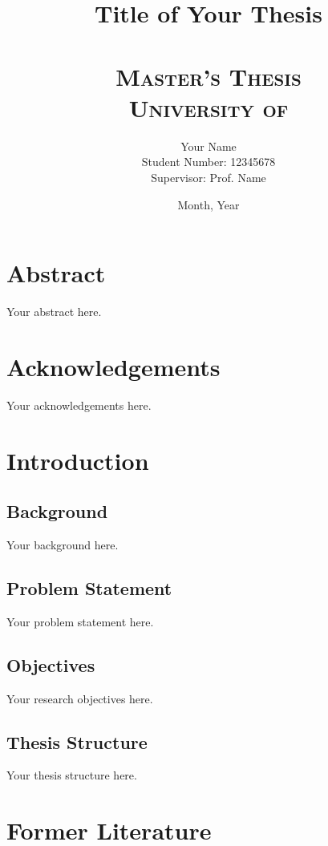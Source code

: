 \documentclass[12pt,a4paper]{report}
\title{
    \HRule \\[0.4cm]
    {\huge \bfseries Title of Your Thesis \\[0.4cm]}
    \HRule \\[1.5cm]
    \textsc{\Large Master's Thesis}\\[0.5cm]
    \textsc{\large University of }\\[0.5cm]
}
\author{
    \Large Your Name\\
    \Large Student Number: 12345678\\
    \Large Supervisor: Prof. Name
}
\date{Month, Year}
\begin{document}
\maketitle
\thispagestyle{empty}
\newpage

\chapter*{Abstract}
Your abstract here.

\newpage

\chapter*{Acknowledgements}
Your acknowledgements here.

\newpage

\tableofcontents

\newpage
\listoffigures

\newpage
\listoftables

\newpage
{}

\chapter{Introduction}
\section{Background}
Your background here.

\section{Problem Statement}
Your problem statement here.

\section{Objectives}
Your research objectives here.

\section{Thesis Structure}
Your thesis structure here.

\chapter{Former Literature}
\end{document}
